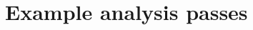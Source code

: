 \documentclass[blockstyle,preprint,nocopyrightspace]{sigplanconf}
\newcommand\secref[1]{Section~\ref{sec:#1}}
\newcommand\seclabel[1]{\label{sec:#1}}
\begin{document}





\section{Example analysis passes}

\seclabel{example-analyses}


\newcommand\T{\rule{0pt}{0.6ex}}
\newcommand\B{\rule[-0.05ex]{0pt}{0pt}}
\newenvironment{codetable}{\begin{tabular}{CL}}{\end{tabular}}
\end{document}
